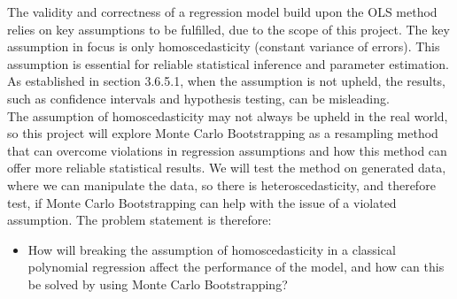 \label{sec:PBS}
The validity and correctness of a regression model build upon the OLS method relies on key assumptions to be fulfilled, due to the scope of this project. The key assumption in focus is only homoscedasticity (constant variance of errors). This assumption is essential for reliable statistical inference and parameter estimation. As established in section 3.6.5.1, when the assumption is not upheld, the results, such as confidence intervals and hypothesis testing, can be misleading.\\
The assumption of homoscedasticity may not always be upheld in the real world, so this project will explore Monte Carlo Bootstrapping as a resampling method that can overcome violations in regression assumptions and how this method can offer more reliable statistical results. We will test the method on generated data, where we can manipulate the data, so there is heteroscedasticity, and therefore test, if Monte Carlo Bootstrapping can help with the issue of a violated assumption. The problem statement is therefore:



\begin{itemize}
	\item How will breaking the assumption of homoscedasticity in a classical polynomial regression affect the performance of the model, and how can this be solved by using Monte Carlo Bootstrapping?
\end{itemize}
